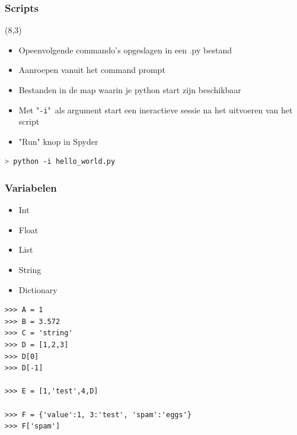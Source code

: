 \documentclass[t]{beamer}
\begin{document}
\begin{frame}[fragile]
	\frametitle{Scripts}
	\begin{textblock}{6}(8,3)
    \end{textblock}
    
	\begin{itemize}
		\item Opeenvolgende commando's opgeslagen in een .py bestand
		\item Aanroepen vanuit het command prompt
		\item Bestanden in de map waarin je python start zijn beschikbaar
		\item Met "\lstinline[language=bash]{-i}"\ als argument start een ineractieve sessie na het uitvoeren van het script 
	\end{itemize}
	
	\vspace{0.5cm}
	
	\begin{itemize}
		\item "Run" knop in Spyder
	\end{itemize}
		
	\vspace{0.5cm}
	
	\begin{lstlisting}[language=bash]
> python -i hello_world.py
	\end{lstlisting}
\end{frame}
\begin{frame}[fragile]
	\frametitle{Variabelen}

	\begin{itemize}
		\item Int
		\item Float
		\item List
		\item String
		\item Dictionary
	\end{itemize}
	
	\begin{lstlisting}
>>> A = 1
>>> B = 3.572
>>> C = 'string'
>>> D = [1,2,3]
>>> D[0]
>>> D[-1]

>>> E = [1,'test',4,D]

>>> F = {'value':1, 3:'test', 'spam':'eggs'}
>>> F['spam']
	\end{lstlisting}
	
\end{frame}
\end{document}

